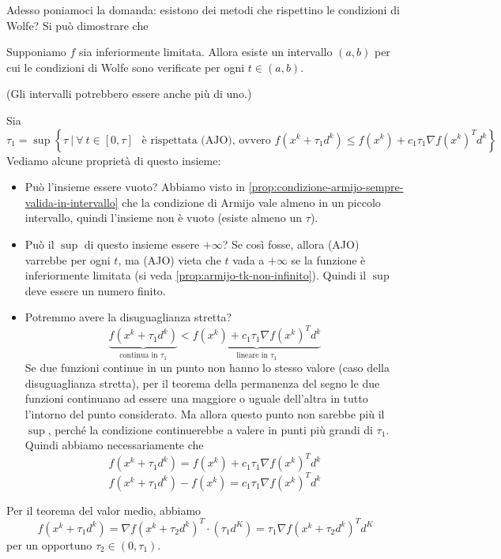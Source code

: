 Adesso poniamoci la domanda: esistono dei metodi che rispettino le
condizioni di Wolfe? Si può dimostrare che
\begin{proposition} Supponiamo $f$ sia inferiormente limitata. Allora
esiste un intervallo $(a,b)$ per cui le condizioni di Wolfe sono
verificate per ogni $t \in (a,b)$.

(Gli intervalli potrebbero essere anche pi\`u di uno.)
\begin{thproof} Sia
$$\tau_1= \sup \left\{ \tau ~ | ~  \forall ~ t \in [0, \tau]\ ~ \text{ \`e rispettata (AJO), ovvero } f(x^k + \tau_1 d^k) \leq f(x^k) + c_1 \tau_1 \nabla f(x^k)^T d^k \right\}$$
Vediamo alcune propriet\`a di questo insieme:
\begin{itemize}
\item Può l'insieme essere vuoto? Abbiamo visto in
\ref{prop:condizione-armijo-sempre-valida-in-intervallo} che la
condizione di Armijo vale almeno in un piccolo intervallo, quindi
l'insieme non \`e vuoto (esiste almeno un $\tau$).

\item Può il $\sup$ di questo insieme essere $+ \infty$? Se così
fosse, allora (AJO) varrebbe per ogni $t$, ma (AJO) vieta che $t$ vada
a $+\infty$ se la funzione \`e inferiormente limitata (si veda
\ref{prop:armijo-tk-non-infinito}). Quindi il $\sup$ deve essere un
numero finito.

\item Potremmo avere la disuguaglianza stretta?
$$ \underbrace{f(x^{k} + \tau_{1} d^{k})}_{\text{continua in }\tau_1} < \underbrace{f(x^{k}) + c_1 \tau_1 \nabla f(x^{k})^{T}d^{k}}_{\text{lineare in }\tau_1}$$
Se due funzioni continue in un punto non hanno lo stesso valore (caso
della disuguaglianza stretta), per il teorema della permanenza del
segno le due funzioni continuano ad essere una maggiore o uguale
dell'altra in tutto l'intorno del punto considerato. Ma allora questo
punto non sarebbe pi\`u il $\sup$, perch\'e la condizione continuerebbe a
valere in punti pi\`u grandi di $\tau_1$. Quindi abbiamo necessariamente
che
$$ f(x^{k} + \tau_{1} d^{k}) = f(x^{k}) + c_1 \tau_1 \nabla f(x^{k})^{T}d^{k}$$
\begin{equation}
\label{eq:esiste-intervallo-wolfe-no-disug-stretta} f(x^{k} + \tau_{1}
d^{k}) - f(x^{k}) = c_1 \tau_1 \nabla f(x^{k})^{T}d^{k}
\end{equation}
\end{itemize}

Per il teorema del valor medio, abbiamo
$$ f(x^{k} + \tau_{1} d^{k}) = \nabla f(x^{k} + \tau_2 d^{k})^{T} \cdot (\tau_1 d^{K}) = \tau_1 \nabla f(x^{k} + \tau_2 d^{k})^{T} d^{K}$$
per un opportuno $\tau_2 \in (0, \tau_1)$.


\end{thproof}
\end{proposition}
